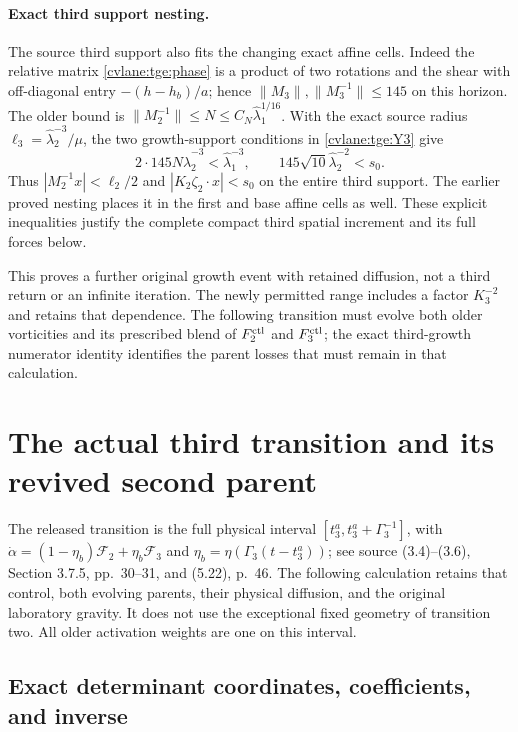 \paragraph{Exact third support nesting.}\label{cvlane:tge:nesting}
The source third support also fits the changing exact affine cells.
Indeed the relative matrix \eqref{cvlane:tge:phase} is a product of two
rotations and the shear with off-diagonal entry $-(h-h_b)/a$;
hence $\|M_3\|,\|M_3^{-1}\|\leq145$ on this horizon.
The older bound is $\|M_2^{-1}\|\leq N\leq
C_N\widehat\lambda_1^{1/16}$. With the exact source radius
$\ell_3=\widehat\lambda_2^{-3}/\mu$, the two growth-support conditions
in \eqref{cvlane:tge:Y3} give
\[
 2\cdot145N\widehat\lambda_2^{-3}<\widehat\lambda_1^{-3},
 \qquad145\sqrt{10}\widehat\lambda_2^{-2}<s_0.
\]
Thus $|M_2^{-1}x|<\ell_2/2$ and
$|K_2\zeta_2\cdot x|<s_0$ on the entire third support.
The earlier proved nesting places it in the first and base affine
cells as well. These explicit inequalities justify the complete
compact third spatial increment and its full forces below.

This proves a further original growth event with retained diffusion,
not a third return or an infinite iteration. The newly permitted
range includes a factor $K_3^{-2}$ and retains that dependence.
The following transition must evolve both older vorticities and its
prescribed blend of $F_2^{\rm ctl}$ and $F_3^{\rm ctl}$; the exact
third-growth numerator identity identifies the parent losses that
must remain in that calculation.


\section{The actual third transition and its revived second parent}
\label{cvlane:tt:section}

The released transition is the full physical interval
$[t_3^a,t_3^a+\Gamma_3^{-1}]$, with
$\dot\alpha=(1-\eta_b)\mathcal F_2+\eta_b\mathcal F_3$ and
$\eta_b=\eta(\Gamma_3(t-t_3^a))$; see source (3.4)--(3.6),
Section 3.7.5, pp.~30--31, and (5.22), p.~46.
The following calculation retains that control, both evolving parents,
their physical diffusion, and the original laboratory gravity.
It does not use the exceptional fixed geometry of transition two.
All older activation weights are one on this interval.

\subsection{Exact determinant coordinates, coefficients, and inverse}


